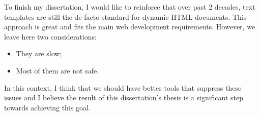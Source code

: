 \noindent
To finish my dissertation, I would like to reinforce that over past 2 decades, text templates are still the de facto standard for dynamic \ac{HTML} documents. This approach is great and fits the main web development requirements. However, we leave here two considerations:

\begin{itemize}
	\item They are slow;
	\item Most of them are not safe.
\end{itemize}

\noindent
In this context, I think that we should have better tools that suppress these issues and I believe the result of this dissertation's thesis is a significant step towards achieving this goal.